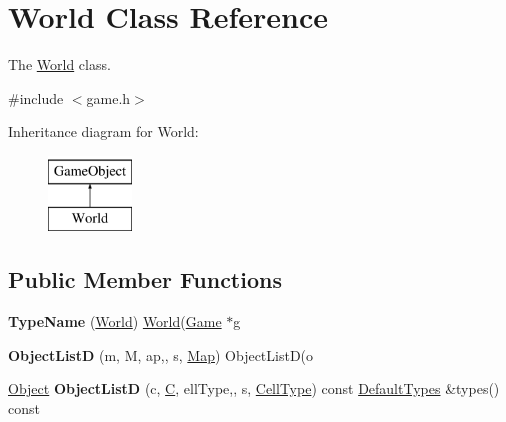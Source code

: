 \hypertarget{class_world}{\section{\-World \-Class \-Reference}
\label{class_world}
}


\-The \hyperlink{class_world}{\-World} class.  




{\ttfamily \#include $<$game.\-h$>$}

\-Inheritance diagram for \-World\-:\begin{figure}[H]
\begin{center}
\leavevmode
\includegraphics[height=2.000000cm]{class_world}
\end{center}
\end{figure}
\subsection*{\-Public \-Member \-Functions}
\begin{DoxyCompactItemize}
\item 
\hypertarget{class_world_a9b9332f44adcdf278a8f47aac205ac53}{{\bfseries \-Type\-Name} (\hyperlink{class_world}{\-World}) \hyperlink{class_world}{\-World}(\hyperlink{class_game}{\-Game} $\ast$g}\label{class_world_a9b9332f44adcdf278a8f47aac205ac53}

\item 
\hypertarget{class_world_a7fe6abb143814e0f87145648982f46af}{{\bfseries \-Object\-List\-D} (m, \-M, ap,, s, \hyperlink{class_map}{\-Map}) \-Object\-List\-D(o}\label{class_world_a7fe6abb143814e0f87145648982f46af}

\item 
\hypertarget{class_world_a43e1700cc297a1ea2522afa7d477109c}{\hyperlink{class_object}{\-Object} {\bfseries \-Object\-List\-D} (c, \hyperlink{gameobject_8h_af50e2bbaaebe8da60a8d514fca706273}{\-C}, ell\-Type,, s, \hyperlink{class_cell_type}{\-Cell\-Type}) const \hyperlink{class_default_types}{\-Default\-Types} \&types() const }\label{class_world_a43e1700cc297a1ea2522afa7d477109c}

\end{DoxyCompactItemize}
